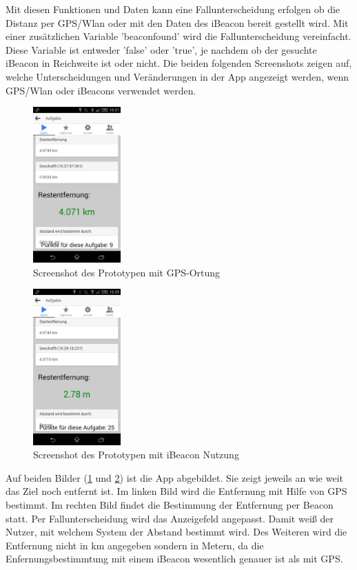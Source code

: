 Mit diesen Funktionen und Daten kann eine Fallunterscheidung erfolgen ob die Distanz per GPS/Wlan oder mit den Daten des iBeacon bereit gestellt wird.
Mit einer zusätzlichen Variable 'beaconfound' wird die Fallunterscheidung vereinfacht. Diese Variable ist entweder 'false' oder 'true', je nachdem ob der gesuchte iBeacon in Reichweite ist oder nicht. Die beiden folgenden Screenshots zeigen auf, welche Unterscheidungen und Veränderungen in der App angezeigt werden, wenn GPS/Wlan oder iBeacons verwendet werden.

\begin{figure}
\centering
\includegraphics[width=0.3\textwidth]{ref/images/screenshot1.png}
\caption[Screenshot des Prototypen mit GPS-Ortung]{Screenshot des Prototypen mit GPS-Ortung}
\label{fig:screenshotapp1}
\end{figure} 

\begin{figure}
\centering
\includegraphics[width=0.3\textwidth]{ref/images/screenshot2.png}
\caption[Screenshot des Prototypen mit iBeacon Nutzung]{Screenshot des Prototypen mit iBeacon Nutzung}
\label{fig:screenshotapp2}
\end{figure} 
Auf beiden Bilder (\ref{fig:screenshotapp1} und \ref{fig:screenshotapp2}) ist die App abgebildet. Sie zeigt jeweils an wie weit das Ziel noch entfernt ist. Im linken Bild wird die Entfernung mit Hilfe von GPS bestimmt. Im rechten Bild findet die Bestimmung der Entfernung per Beacon statt.
Per Fallunterscheidung wird das Anzeigefeld angepasst. Damit weiß der Nutzer, mit welchem System der Abstand bestimmt wird. Des Weiteren wird die Entfernung nicht in km angegeben sondern in Metern, da die Enfernungsbestimmtung mit einem iBeacon wesentlich genauer ist als mit GPS.

